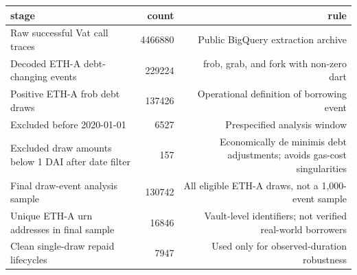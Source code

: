 \begin{tabular}{lrr}
\toprule
stage & count & rule \\
\midrule
Raw successful Vat call traces & 4466880 & Public BigQuery extraction archive \\
Decoded ETH-A debt-changing events & 229224 & frob, grab, and fork with non-zero dart \\
Positive ETH-A frob debt draws & 137426 & Operational definition of borrowing event \\
Excluded before 2020-01-01 & 6527 & Prespecified analysis window \\
Excluded draw amounts below 1 DAI after date filter & 157 & Economically de minimis debt adjustments; avoids gas-cost singularities \\
Final draw-event analysis sample & 130742 & All eligible ETH-A draws, not a 1,000-event sample \\
Unique ETH-A urn addresses in final sample & 16846 & Vault-level identifiers; not verified real-world borrowers \\
Clean single-draw repaid lifecycles & 7947 & Used only for observed-duration robustness \\
\bottomrule
\end{tabular}
